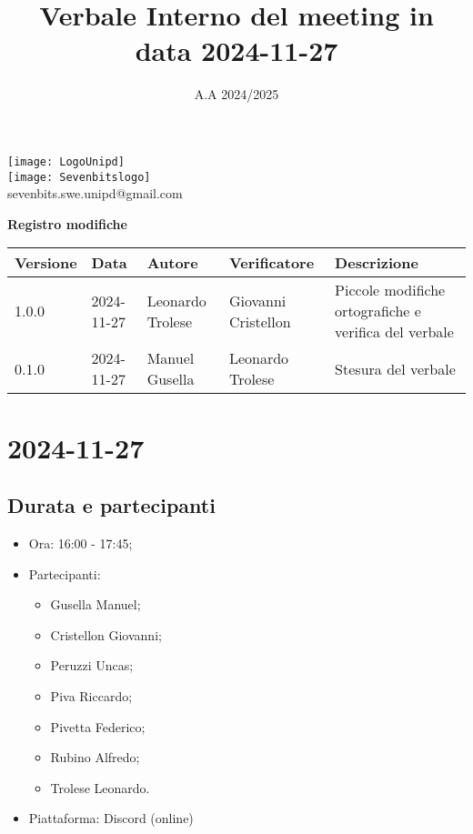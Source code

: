 \documentclass[10pt]{article}
\title{Verbale Interno del meeting in data 2024-11-27}
\date{A.A 2024/2025}
\begin{document}
\maketitle
\begin{center}
\texttt{[image: LogoUnipd]}\\
\texttt{[image: Sevenbitslogo]}\\
sevenbits.swe.unipd@gmail.com\\
\vspace{2mm}

\textbf{Registro modifiche}\\
\vspace{2mm}
\begin{tabularx}{\textwidth}{|l|l|l|l|X|}
\hline
\textbf{Versione} & \textbf{Data} & \textbf{Autore} & \textbf{Verificatore} & \textbf{Descrizione} \\
\hline
1.0.0 & 2024-11-27 & Leonardo Trolese & Giovanni Cristellon & Piccole modifiche ortografiche e verifica del verbale\\
\hline
0.1.0 & 2024-11-27 & Manuel Gusella & Leonardo Trolese & Stesura del verbale\\
\hline
\end{tabularx}
\end{center}

\newpage
\tableofcontents
\newpage
\section{2024-11-27}
\subsection{Durata e partecipanti}
\begin{itemize}
\item Ora: 16:00 - 17:45;
\item Partecipanti: 	
	\begin{itemize}
	\item Gusella Manuel;
	\item Cristellon Giovanni;
	\item Peruzzi Uncas;
	\item Piva Riccardo;
	\item Pivetta Federico;
	\item Rubino Alfredo;
	\item Trolese Leonardo.
	\end{itemize}
\item Piattaforma: Discord (online)
\end{itemize}
\end{document}
